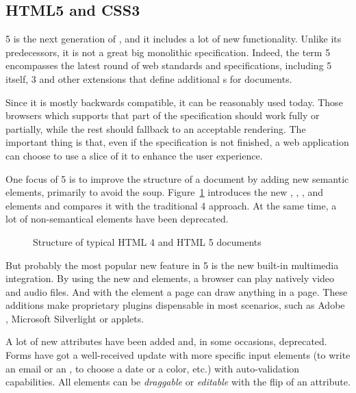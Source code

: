 \subsection{HTML5 and CSS3} %
\label{sub:html5css3}

 5 is the next generation of , and it includes a lot of new functionality\cite{HTML5NEW}.
Unlike its predecessors, it is not a great big monolithic specification.
Indeed, the term  5 encompasses the latest round of web standards and specifications, including  5 itself,  3 and other extensions that define additional s for  documents.

Since it is mostly backwards compatible, it can be reasonably used today.
Those browsers which supports that part of the specification should work fully or partially, while the rest should fallback to an acceptable rendering.
The important thing is that, even if the specification is not finished, a web application can choose to use a slice of it to enhance the user experience.

One focus of  5 is to improve the structure of a document by adding new semantic elements, primarily to avoid the  soup.
Figure~\ref{fig:html-structure} introduces the new , , ,  and  elements and compares it with the traditional  4 approach.
At the same time, a lot of non-semantical elements have been deprecated.

\begin{figure}[htbp]
  \centering
  \caption{Structure of typical HTML 4 and HTML 5 documents}
  \label{fig:html-structure}
\end{figure}

But probably the most popular new feature in  5 is the new built-in multimedia integration.
By using the new  and  elements, a browser can play natively video and audio files.
And with the  element a page can draw anything in a page.
These additions make proprietary plugins dispensable in most scenarios, such as Adobe , Microsoft Silverlight or  applets.

A lot of new attributes have been added and, in some occasions, deprecated.
Forms have got a well-received update with more specific input elements (to write an email or an , to choose a date or a color, etc.) with auto-validation capabilities.
All elements can be \emph{draggable} or \emph{editable} with the flip of an attribute.


